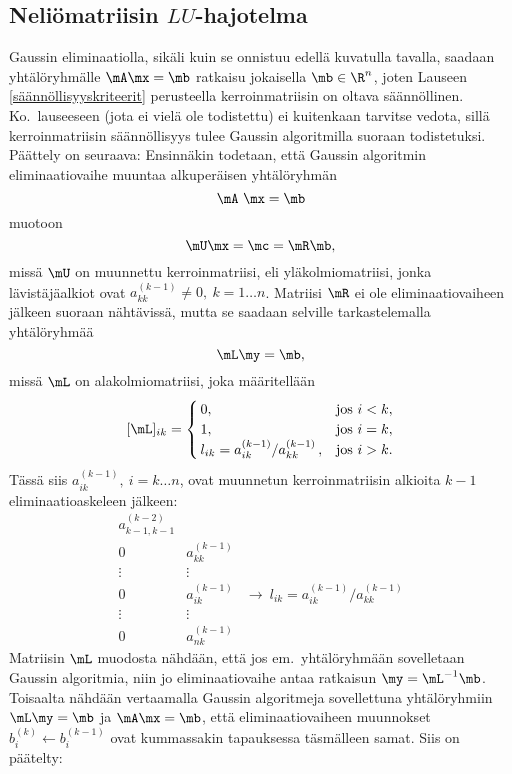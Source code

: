 \subsection*{Neliömatriisin $LU$-hajotelma}

Gaussin eliminaatiolla, sikäli kuin se onnistuu edellä kuvatulla tavalla, saadaan yhtälöryhmälle
$\mA\mx=\mb$ ratkaisu jokaisella $\mb\in\R^n$, joten Lauseen \ref{säännöllisyyskriteerit}
perusteella kerroinmatriisin on oltava säännöllinen. Ko.\ lauseeseen (jota ei vielä ole 
todistettu) ei kuitenkaan tarvitse vedota, sillä kerroinmatriisin säännöllisyys tulee Gaussin
algoritmilla suoraan todistetuksi. Päättely on seuraava: Ensinnäkin todetaan, että Gaussin
algoritmin eliminaatiovaihe muuntaa alkuperäisen yhtälöryhmän
\[
\mA \mx = \mb
\]
muotoon
\[
\mU \mx = \mc = \mR \mb,
\]
missä $\mU$ on muunnettu kerroinmatriisi, eli yläkolmiomatriisi, jonka lävistäjäalkiot ovat 
$a_{kk}^{(k-1)} \neq 0, \ k=1 \ldots n$. Matriisi $\mR$ ei ole eliminaatiovaiheen jälkeen 
suoraan nähtävissä, mutta se saadaan selville tarkastelemalla yhtälöryhmää
\[
\mL \my = \mb,
\]
missä $\mL$ on alakolmiomatriisi, joka määritellään
\[
[\mL]_{ik} = \begin{cases}
\,0, &\text{jos}\ i<k, \\
\,1, &\text{jos}\ i=k, \\
\,l_{ik}=a_{ik}^{(k-1)}/a_{kk}^{(k-1)}\,, &\text{jos}\ i>k.
\end{cases}
\]
Tässä siis $a_{ik}^{(k-1)}, \ i=k \ldots n$, ovat muunnetun kerroinmatriisin alkioita $k-1$ 
eliminaatioaskeleen jälkeen:
\[
\begin{array}{ccc}
a_{k-1,k-1}^{(k-2)} \\
0 & a_{kk}^{(k-1)} \\
\vdots & \vdots \\
0 & a_{ik}^{(k-1)} & \rightarrow\ l_{ik} = a_{ik}^{(k-1)}/a_{kk}^{(k-1)} \\
\vdots & \vdots \\
0 & a_{nk}^{(k-1)}
\end{array}
\]
Matriisin $\mL$ muodosta nähdään, että jos em.\ yhtälöryhmään sovelletaan Gaussin algoritmia, 
niin jo eliminaatiovaihe antaa ratkaisun $\my=\mL^{-1}\mb$. Toisaalta nähdään vertaamalla 
Gaussin algoritmeja sovellettuna yhtälöryhmiin $\mL\my=\mb$ ja $\mA\mx=\mb$, että 
eliminaatiovaiheen muunnokset $b_i^{(k)} \leftarrow b_i^{(k-1)}$ ovat kummassakin tapauksessa 
täsmälleen samat. Siis on päätelty:

